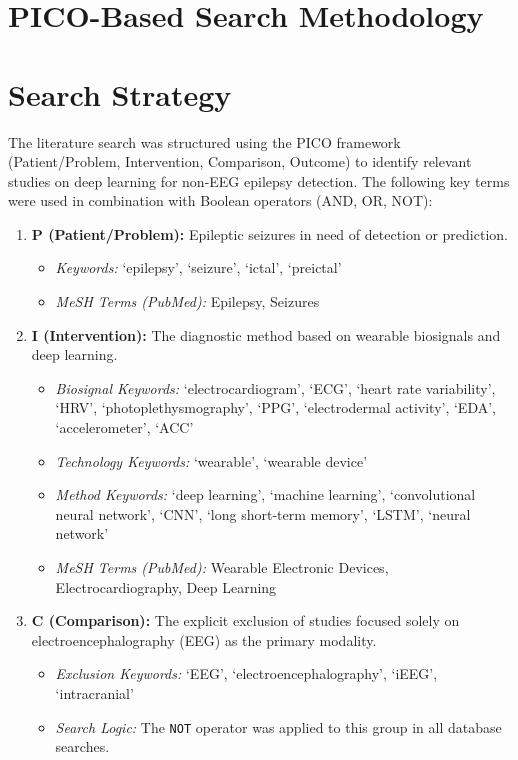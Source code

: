 \section{PICO-Based Search Methodology}
\label{sec:pico-search}

\section{Search Strategy}
The literature search was structured using the PICO framework 
(Patient/Problem, Intervention, Comparison, Outcome) 
to identify relevant studies on deep learning for non-EEG epilepsy
detection. The following key terms were used in combination with 
Boolean operators (AND, OR, NOT):

\begin{enumerate}
    \item \textbf{P (Patient/Problem):} Epileptic seizures in need of detection or prediction.
    \begin{itemize}
        \item \textit{Keywords:} `epilepsy', `seizure', `ictal', `preictal'
        \item \textit{MeSH Terms (PubMed):} Epilepsy, Seizures
    \end{itemize}

    \item \textbf{I (Intervention):} The diagnostic method based on wearable biosignals and deep learning.
    \begin{itemize}
        \item \textit{Biosignal Keywords:} `electrocardiogram', `ECG', `heart rate variability', `HRV', `photoplethysmography', `PPG', `electrodermal activity', `EDA', `accelerometer', `ACC'
        \item \textit{Technology Keywords:} `wearable', `wearable device'
        \item \textit{Method Keywords:} `deep learning', `machine learning', `convolutional neural network', `CNN', `long short-term memory', `LSTM', `neural network'
        \item \textit{MeSH Terms (PubMed):} Wearable Electronic Devices, Electrocardiography, Deep Learning
    \end{itemize}

    \item \textbf{C (Comparison):} The explicit exclusion of studies focused solely on electroencephalography (EEG) as the primary modality.
    \begin{itemize}
        \item \textit{Exclusion Keywords:} `EEG', `electroencephalography', `iEEG', `intracranial'
        \item \textit{Search Logic:} The \texttt{NOT} operator was applied to this group in all database searches.
    \end{itemize}


\end{enumerate}
